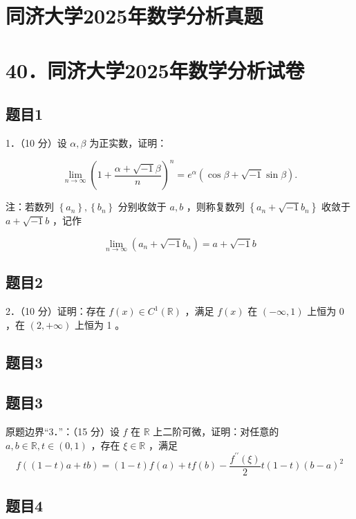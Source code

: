 \documentclass{article}
\begin{document}
\section*{同济大学2025年数学分析真题}
\section*{40．同济大学2025年数学分析试卷}

\subsection{题目1}
1．（10 分）设 \(\alpha, \beta\) 为正实数，证明：

\[
\lim _{n \rightarrow \infty}\left(1+\frac{\alpha+\sqrt{-1} \beta}{n}\right)^{n}=e^{\alpha}(\cos \beta+\sqrt{-1} \sin \beta) .
\]

注：若数列 \(\left\{a_{n}\right\},\left\{b_{n}\right\}\) 分别收敛于 \(a, b\) ，则称复数列 \(\left\{a_{n}+\sqrt{-1} b_{n}\right\}\) 收敛于 \(a+\sqrt{-1} b\) ，记作

\[
\lim _{n \rightarrow \infty}\left(a_{n}+\sqrt{-1} b_{n}\right)=a+\sqrt{-1} b
\]

\subsection{题目2}
2．（10 分）证明：存在 \(f(x) \in C^{1}(\mathbb{R})\) ，满足 \(f(x)\) 在 \((-\infty, 1)\) 上恒为 0 ，在 \((2,+\infty)\) 上恒为 1 。

\begin{itemize}

\subsection{题目3}
\end{itemize}

\subsection{题目3}
原题边界“3．”：（15 分）设 \(f\) 在 \(\mathbb{R}\) 上二阶可微，证明：对任意的 \(a, b \in \mathbb{R}, t \in(0,1)\) ，存在 \(\xi \in \mathbb{R}\) ，满足
\[
f((1-t) a+t b)=(1-t) f(a)+t f(b)-\frac{f^{\prime \prime}(\xi)}{2} t(1-t)(b-a)^{2}
\]

\subsection{题目4}
\end{document}

